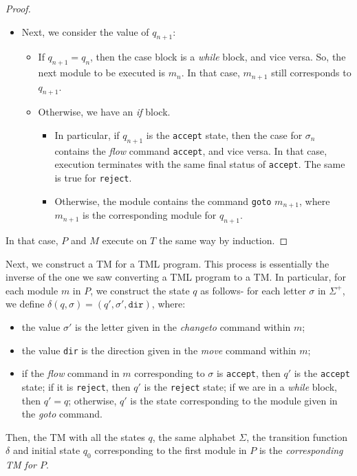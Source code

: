 \documentclass{article}
\begin{document}
\begin{proof}
\begin{itemize}
\begin{itemize}
                \item Next, we consider the value of $q_{n+1}$:
                \begin{itemize}
                    \item If $q_{n+1} = q_n$, then the case block is a \textit{while} block, and vice versa. So, the next module to be executed is $m_n$. In that case, $m_{n+1}$ still corresponds to $q_{n+1}$.
                    \item Otherwise, we have an \textit{if} block. 
                    \begin{itemize}
                        \item In particular, if $q_{n+1}$ is the \texttt{accept} state, then the case for $\sigma_n$ contains the \textit{flow} command \texttt{accept}, and vice versa. In that case, execution terminates with the same final status of \texttt{accept}. The same is true for \texttt{reject}. 
                        \item Otherwise, the module contains the command \texttt{goto} $m_{n+1}$, where $m_{n+1}$ is the corresponding module for $q_{n+1}$.
                    \end{itemize}
                \end{itemize}
            \end{itemize}
        \end{itemize}
        In that case, $P$ and $M$ execute on $T$ the same way by induction.
    \end{proof}

    Next, we construct a TM for a TML program. This process is essentially the inverse of the one we saw converting a TML program to a TM. In particular, for each module $m$ in $P$, we construct the state $q$ as follows- for each letter $\sigma$ in $\Sigma^+$, we define $\delta(q, \sigma) = (q', \sigma', \texttt{dir})$, where:
    \begin{itemize}
        \item the value $\sigma'$ is the letter given in the \textit{changeto} command within $m$;
        \item the value \texttt{dir} is the direction given in the \textit{move} command within $m$;
        \item if the \textit{flow} command in $m$ corresponding to $\sigma$ is \texttt{accept}, then $q'$ is the \texttt{accept} state; if it is \texttt{reject}, then $q'$ is the \texttt{reject} state; if we are in a \textit{while} block, then $q' = q$; otherwise, $q'$ is the state corresponding to the module given in the \textit{goto} command.
    \end{itemize}
    Then, the TM with all the states $q$, the same alphabet $\Sigma$, the transition function $\delta$ and initial state $q_0$ corresponding to the first module in $P$ is the \emph{corresponding TM for $P$}. 
\end{document}

